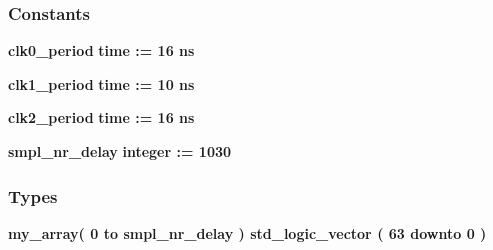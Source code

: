 \subsubsection*{Constants}
 \begin{DoxyCompactItemize}
\item 
{\bf clk0\+\_\+period} {\bfseries \textcolor{comment}{time}\textcolor{vhdlchar}{ }\textcolor{vhdlchar}{ }\textcolor{vhdlchar}{\+:}\textcolor{vhdlchar}{=}\textcolor{vhdlchar}{ }\textcolor{vhdlchar}{ }\textcolor{vhdlchar}{ } \textcolor{vhdldigit}{16} \textcolor{vhdlchar}{ }\textcolor{vhdlchar}{ns}\textcolor{vhdlchar}{ }} 
\item 
{\bf clk1\+\_\+period} {\bfseries \textcolor{comment}{time}\textcolor{vhdlchar}{ }\textcolor{vhdlchar}{ }\textcolor{vhdlchar}{\+:}\textcolor{vhdlchar}{=}\textcolor{vhdlchar}{ }\textcolor{vhdlchar}{ }\textcolor{vhdlchar}{ } \textcolor{vhdldigit}{10} \textcolor{vhdlchar}{ }\textcolor{vhdlchar}{ns}\textcolor{vhdlchar}{ }} 
\item 
{\bf clk2\+\_\+period} {\bfseries \textcolor{comment}{time}\textcolor{vhdlchar}{ }\textcolor{vhdlchar}{ }\textcolor{vhdlchar}{\+:}\textcolor{vhdlchar}{=}\textcolor{vhdlchar}{ }\textcolor{vhdlchar}{ }\textcolor{vhdlchar}{ } \textcolor{vhdldigit}{16} \textcolor{vhdlchar}{ }\textcolor{vhdlchar}{ns}\textcolor{vhdlchar}{ }} 
\item 
{\bf smpl\+\_\+nr\+\_\+delay} {\bfseries \textcolor{comment}{integer}\textcolor{vhdlchar}{ }\textcolor{vhdlchar}{ }\textcolor{vhdlchar}{\+:}\textcolor{vhdlchar}{=}\textcolor{vhdlchar}{ }\textcolor{vhdlchar}{ } \textcolor{vhdldigit}{1030} \textcolor{vhdlchar}{ }} 
\end{DoxyCompactItemize}
\subsubsection*{Types}
 \begin{DoxyCompactItemize}
\item 
{\bfseries {\bf my\+\_\+array}{\bfseries \textcolor{vhdlchar}{(}\textcolor{vhdlchar}{ }\textcolor{vhdlchar}{ } \textcolor{vhdldigit}{0} \textcolor{vhdlchar}{ }\textcolor{keywordflow}{to}\textcolor{vhdlchar}{ }\textcolor{vhdlchar}{ }\textcolor{vhdlchar}{ }\textcolor{vhdlchar}{ }{\bfseries {\bf smpl\+\_\+nr\+\_\+delay}} \textcolor{vhdlchar}{ }\textcolor{vhdlchar}{)}\textcolor{vhdlchar}{ }\textcolor{vhdlchar}{ }\textcolor{comment}{std\+\_\+logic\+\_\+vector}\textcolor{vhdlchar}{ }\textcolor{vhdlchar}{(}\textcolor{vhdlchar}{ }\textcolor{vhdlchar}{ } \textcolor{vhdldigit}{63} \textcolor{vhdlchar}{ }\textcolor{keywordflow}{downto}\textcolor{vhdlchar}{ }\textcolor{vhdlchar}{ } \textcolor{vhdldigit}{0} \textcolor{vhdlchar}{ }\textcolor{vhdlchar}{)}\textcolor{vhdlchar}{ }}} 
\end{DoxyCompactItemize}
